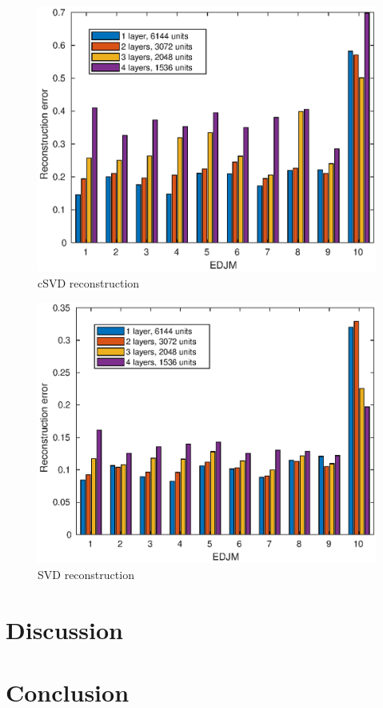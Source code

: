 \begin{figure}[H]
  \centering
  \includegraphics[scale=0.6]{Figures/csvd_reconstruction.eps}
  \caption{cSVD reconstruction}
  \label{fig:csvd:reconstruction}
\end{figure}

\begin{figure}[H]
  \centering
  \includegraphics[scale=0.6]{Figures/svd_reconstruction.eps}
  \caption{SVD reconstruction}
  \label{fig:csvd:reconstruction}
\end{figure}

\section{Discussion}

\section{Conclusion}
